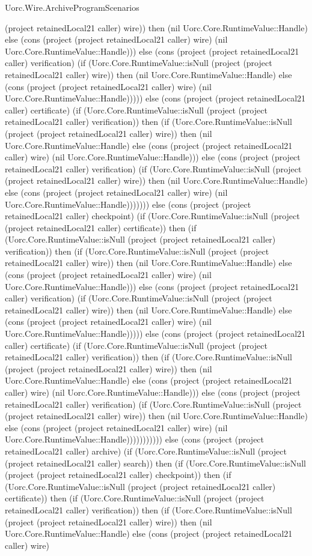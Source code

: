 \begin{lexlean}{Uorc.Wire.ArchiveProgramScenarios}
\begin{semanticmodule}
{(project retainedLocal21 caller) wire)) then (nil Uorc.Core.RuntimeValue::Handle) else (cons (project (project retainedLocal21 caller) wire) (nil Uorc.Core.RuntimeValue::Handle))) else (cons (project (project retainedLocal21 caller) verification) (if (Uorc.Core.RuntimeValue::isNull (project (project retainedLocal21 caller) wire)) then (nil Uorc.Core.RuntimeValue::Handle) else (cons (project (project retainedLocal21 caller) wire) (nil Uorc.Core.RuntimeValue::Handle))))) else (cons (project (project retainedLocal21 caller) certificate) (if (Uorc.Core.RuntimeValue::isNull (project (project retainedLocal21 caller) verification)) then (if (Uorc.Core.RuntimeValue::isNull (project (project retainedLocal21 caller) wire)) then (nil Uorc.Core.RuntimeValue::Handle) else (cons (project (project retainedLocal21 caller) wire) (nil Uorc.Core.RuntimeValue::Handle))) else (cons (project (project retainedLocal21 caller) verification) (if (Uorc.Core.RuntimeValue::isNull (project (project retainedLocal21 caller) wire)) then (nil Uorc.Core.RuntimeValue::Handle) else (cons (project (project retainedLocal21 caller) wire) (nil Uorc.Core.RuntimeValue::Handle))))))) else (cons (project (project retainedLocal21 caller) checkpoint) (if (Uorc.Core.RuntimeValue::isNull (project (project retainedLocal21 caller) certificate)) then (if (Uorc.Core.RuntimeValue::isNull (project (project retainedLocal21 caller) verification)) then (if (Uorc.Core.RuntimeValue::isNull (project (project retainedLocal21 caller) wire)) then (nil Uorc.Core.RuntimeValue::Handle) else (cons (project (project retainedLocal21 caller) wire) (nil Uorc.Core.RuntimeValue::Handle))) else (cons (project (project retainedLocal21 caller) verification) (if (Uorc.Core.RuntimeValue::isNull (project (project retainedLocal21 caller) wire)) then (nil Uorc.Core.RuntimeValue::Handle) else (cons (project (project retainedLocal21 caller) wire) (nil Uorc.Core.RuntimeValue::Handle))))) else (cons (project (project retainedLocal21 caller) certificate) (if (Uorc.Core.RuntimeValue::isNull (project (project retainedLocal21 caller) verification)) then (if (Uorc.Core.RuntimeValue::isNull (project (project retainedLocal21 caller) wire)) then (nil Uorc.Core.RuntimeValue::Handle) else (cons (project (project retainedLocal21 caller) wire) (nil Uorc.Core.RuntimeValue::Handle))) else (cons (project (project retainedLocal21 caller) verification) (if (Uorc.Core.RuntimeValue::isNull (project (project retainedLocal21 caller) wire)) then (nil Uorc.Core.RuntimeValue::Handle) else (cons (project (project retainedLocal21 caller) wire) (nil Uorc.Core.RuntimeValue::Handle))))))))))) else (cons (project (project retainedLocal21 caller) archive) (if (Uorc.Core.RuntimeValue::isNull (project (project retainedLocal21 caller) search)) then (if (Uorc.Core.RuntimeValue::isNull (project (project retainedLocal21 caller) checkpoint)) then (if (Uorc.Core.RuntimeValue::isNull (project (project retainedLocal21 caller) certificate)) then (if (Uorc.Core.RuntimeValue::isNull (project (project retainedLocal21 caller) verification)) then (if (Uorc.Core.RuntimeValue::isNull (project (project retainedLocal21 caller) wire)) then (nil Uorc.Core.RuntimeValue::Handle) else (cons (project (project retainedLocal21 caller) wire) }
\end{semanticmodule}
\end{lexlean}
